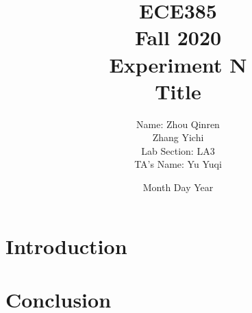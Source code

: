 \documentclass[12pt]{article}
\title{
    \textbf{\Huge ECE385} \\
    \huge Fall 2020 \\
    \huge Experiment N \\[120pt]
    \textbf{\Huge Title} \\[120pt]
    }
\author{
    \large Name: Zhou Qinren \\ 
            \quad\qquad Zhang Yichi \\
    \large Lab Section: LA3 \\
    \large TA's Name: Yu Yuqi
    }
\date{Month Day Year}
\begin{document}
\setlength{\parindent}{0pt}
\maketitle
\newpage

\section{Introduction}


\section{Conclusion}


\newpage


\end{document}
